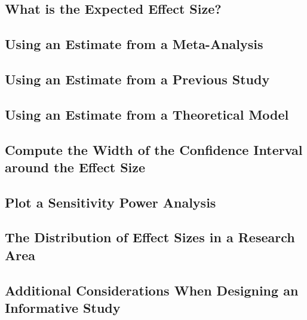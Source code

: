 \documentclass[
  oneside]{krantz}
\begin{document}
\hypertarget{what-is-the-expected-effect-size}{%
\subsection{What is the Expected Effect
Size?}\label{what-is-the-expected-effect-size}}

\hypertarget{using-an-estimate-from-a-meta-analysis}{%
\subsection{Using an Estimate from a
Meta-Analysis}\label{using-an-estimate-from-a-meta-analysis}}

\hypertarget{using-an-estimate-from-a-previous-study}{%
\subsection{Using an Estimate from a Previous
Study}\label{using-an-estimate-from-a-previous-study}}

\hypertarget{using-an-estimate-from-a-theoretical-model}{%
\subsection{Using an Estimate from a Theoretical
Model}\label{using-an-estimate-from-a-theoretical-model}}

\hypertarget{compute-the-width-of-the-confidence-interval-around-the-effect-size}{%
\subsection{Compute the Width of the Confidence Interval around the
Effect
Size}\label{compute-the-width-of-the-confidence-interval-around-the-effect-size}}

\hypertarget{plot-a-sensitivity-power-analysis}{%
\subsection{Plot a Sensitivity Power
Analysis}\label{plot-a-sensitivity-power-analysis}}

\hypertarget{the-distribution-of-effect-sizes-in-a-research-area}{%
\subsection{The Distribution of Effect Sizes in a Research
Area}\label{the-distribution-of-effect-sizes-in-a-research-area}}

\hypertarget{additional-considerations-when-designing-an-informative-study}{%
\subsection{Additional Considerations When Designing an Informative
Study}\label{additional-considerations-when-designing-an-informative-study}}
\end{document}
